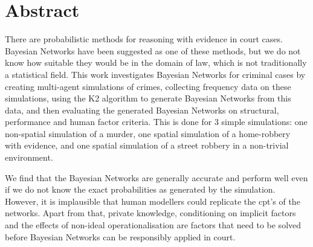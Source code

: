  

\chapter[Abstract]{Abstract}

There are probabilistic methods for reasoning with evidence in court cases. Bayesian Networks have been suggested as one of these methods, but we do not know how suitable they would be in the domain of law, which is not traditionally a statistical field. This work investigates Bayesian Networks for criminal cases by creating multi-agent simulations of crimes, collecting frequency data on these simulations, using the K2 algorithm to generate Bayesian Networks from this data, and then evaluating the generated Bayesian Networks on structural, performance and human factor criteria. This is done for 3 simple simulations: one non-spatial simulation of a murder, one spatial simulation of a home-robbery with evidence, and one spatial simulation of a street robbery in a non-trivial environment.

We find that the Bayesian Networks are generally accurate and perform well even if we do not know the exact probabilities as generated by the simulation. However, it is implausible that human modellers could replicate the cpt's of the networks. Apart from that, private knowledge, conditioning on implicit factors and the effects of non-ideal operationalisation are factors that need to be solved before Bayesian Networks can be responsibly applied in court.